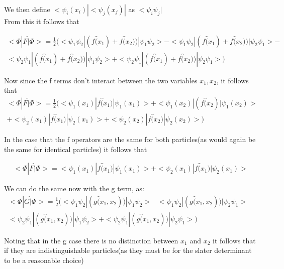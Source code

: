 \documentclass[11pt]{article} %
\begin{document}
We then define $<\psi_i(x_i)|<\psi_j(x_j)|$ as $<\psi_i \psi_j|$\\ 


From this it follows that

\begin{equation}
\begin{split}
<\Phi|F\hat|\Phi>=\frac{1}{2}(<\psi_1 \psi_2|(f\hat(x_1)+f\hat(x_2))|\psi_1\psi_2>-<\psi_1\psi_2|(f\hat(x_1)+f\hat(x_2))|\psi_2\psi_1>-\\ <\psi_2 \psi_1|(f\hat(x_1)+f\hat(x_2))|\psi_1\psi_2>+<\psi_2\psi_1|(f\hat(x_1)+f\hat(x_2))|\psi_2\psi_1>)
\end{split}
\end{equation}

Now since the f terms don't interact between the two variables $x_1, x_2$, it follows that\\
\begin{equation}
\begin{split}
<\Phi|F\hat|\Phi>=\frac{1}{2}(<\psi_1(x_1)|f\hat(x_1)|\psi_1(x_1)>+<\psi_1(x_2)|(f\hat(x_2)|\psi_1(x_2)>\\+<\psi_2(x_1)|f\hat(x_1)|\psi_2(x_1)>+<\psi_2(x_2)|f\hat(x_2)|\psi_2(x_2)>)
\end{split}
\end{equation}


In the case that the f operators are the same for both particles(as would again be the same for identical particles) it follows that

\begin{equation}
\begin{split}
<\Phi|F\hat|\Phi>=<\psi_1(x_1)|f\hat(x_1)|\psi_1(x_1)>+<\psi_2(x_1)|f\hat(x_1)|\psi_2(x_1)>
\end{split}
\end{equation}

We can do the same now with the g term, as:\\
\begin{equation}
\begin{split}
<\Phi|G\hat|\Phi>=\frac{1}{2}(<\psi_1 \psi_2|(g\hat(x_1,x_2))|\psi_1\psi_2>-<\psi_1\psi_2|(g\hat(x_1,x_2))|\psi_2\psi_1>-\\ <\psi_2 \psi_1|(g\hat(x_1,x_2))|\psi_1\psi_2>+<\psi_2\psi_1|(g\hat(x_1,x_2))|\psi_2\psi_1>)
\end{split}
\end{equation}

Noting that in the g case there is no distinction between $x_1$ and $x_2$ it follows that if they are indistinguishable particles(as they must be for the slater determinant to be a reasonable choice)\\
\end{document}
